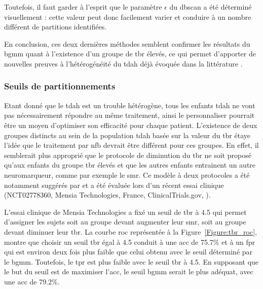 Toutefois, il faut garder à l'esprit que le paramètre $\epsilon$ du \gls{dbscan} a été déterminé visuellement : cette valeur peut donc facilement varier et conduire à
un nombre différent de partitions identifiées. 

En conclusion, ces deux dernières méthodes semblent confirmer les résultats du \gls{bgmm} quant à l'existence d'un groupe de \gls{tbr} élevés, ce qui permet 
d'apporter de nouvelles preuves à l'hétérogénéité du \gls{tdah} déjà évoquée dans la littérature \citep{Arns2008, Arns2012, Barry2003, Clarke2011, 
Liechti2013, Loo2013, Loo2018}.

\subsubsection{Seuils de partitionnements}

Etant donné que le \gls{tdah} est un trouble hétérogène, tous les enfants \gls{tdah} ne vont pas nécessairement répondre au même traitement, ainsi le personnaliser 
pourrait être un moyen d'optimiser son efficacité pour chaque patient. L'existence de deux groupes distincts au sein de la 
population \gls{tdah} basée sur la valeur du \gls{tbr} étaye l'idée que le traitement par \gls{nfb} devrait être différent pour ces groupes. En effet, il semblerait
plus approprié que le protocole de diminution du \gls{tbr} ne soit proposé qu'aux enfants du groupe \gls{tbr} élevés et que les autres enfants entrainent un autre
neuromarqueur, comme par exemple le \gls{smr}. Ce modèle à deux protocoles a été notamment suggérés par \citet{Kerson2013, Arns2012} et a été évaluée lors 
d'un récent essai clinique (NCT02778360, Mensia Technologies, France, ClinicalTrials.gov, \citet{Bioulac2019}).

L'essai clinique de Mensia Technologies a fixé un seuil de \gls{tbr} à 4.5 qui permet d'assigner les sujets soit au groupe devant augmenter leur \gls{smr}, soit 
au groupe devant diminuer leur \gls{tbr}. La courbe \gls{roc} représentée à la Figure~\ref{Figure:tbr_roc}, montre que choisir un seuil \gls{tbr} égal à 4.5 conduit
à une \gls{acc} de 75.7\% et à un \gls{fpr} qui est environ deux fois plus faible que celui obtenu avec le seuil déterminé par le \gls{bgmm}. Toutefois, 
le \gls{tpr} est plus faible avec le seuil \gls{tbr} à 4.5. En supposant que le but du seuil est de maximiser l'\gls{acc}, le seuil \gls{bgmm} serait le 
plus adéquat, avec une \gls{acc} de 79.2\%.

